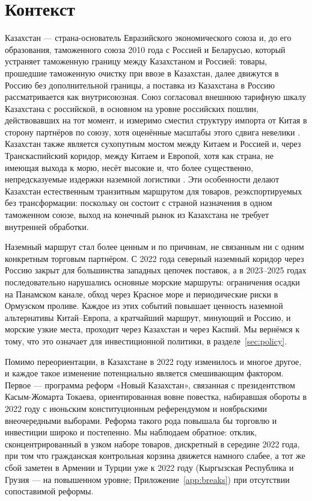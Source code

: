 \documentclass[12pt]{article}
\begin{document}
\section{Контекст}\label{sec:setting}

Казахстан — страна-основатель Евразийского экономического союза и, до его образования,
таможенного союза 2010 года с Россией и Беларусью, который устраняет таможенную границу
между Казахстаном и Россией: товары, прошедшие таможенную очистку при ввозе в Казахстан,
далее движутся в Россию без дополнительной границы, а поставка из Казахстана в Россию
рассматривается как внутрисоюзная. Союз согласовал внешнюю тарифную шкалу Казахстана с
российской, в основном на уровне российских пошлин, действовавших на тот момент, и
измеримо сместил структуру импорта от Китая в сторону партнёров по союзу, хотя оценённые
масштабы этого сдвига невелики \citep{isakova2016tariffs}. Казахстан также является
сухопутным мостом между Китаем и Россией и, через Транскаспийский коридор, между Китаем
и Европой, хотя как страна, не имеющая выхода к морю, несёт высокие и, что более
существенно, непредсказуемые издержки наземной логистики \citep{arvis2010landlocked}. Эти
особенности делают Казахстан естественным транзитным маршрутом для товаров, реэкспортируемых
без трансформации: поскольку он состоит с страной назначения в одном таможенном союзе,
выход на конечный рынок из Казахстана не требует внутренней обработки.

Наземный маршрут стал более ценным и по причинам, не связанным ни с одним конкретным
торговым партнёром. С 2022 года северный наземный коридор через Россию закрыт для
большинства западных цепочек поставок, а в 2023--2025 годах последовательно нарушались
основные морские маршруты: ограничения осадки на Панамском канале, обход через Красное
море и периодические риски в Ормузском проливе. Каждое из этих событий повышает ценность
наземной альтернативы Китай--Европа, а кратчайший маршрут, минующий и Россию, и морские
узкие места, проходит через Казахстан и через Каспий. Мы вернёмся к тому, что это означает
для инвестиционной политики, в разделе~\ref{sec:policy}.

Помимо переориентации, в Казахстане в 2022 году изменилось и многое другое, и каждое такое
изменение потенциально является смешивающим фактором. Первое — программа реформ «Новый
Казахстан», связанная с президентством Касым-Жомарта Токаева, ориентированная вовне
повестка, набиравшая обороты в 2022 году с июньским конституционным референдумом и
ноябрьскими внеочередными выборами. Реформа такого рода повышала бы торговлю и инвестиции
широко и постепенно. Мы наблюдаем обратное: отклик, сконцентрированный в узком наборе
товаров, дискретный в середине 2022 года, при том что гражданская контрольная корзина
движется намного слабее, а тот же сбой заметен в Армении и Турции уже к 2022 году
(Кыргызская Республика и Грузия — на повышенном уровне; Приложение~\ref{app:breaks}) при
отсутствии сопоставимой реформы.
\end{document}
